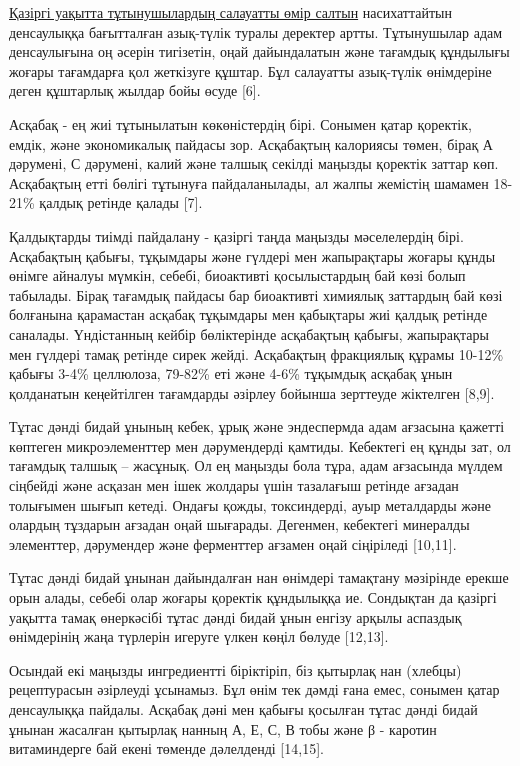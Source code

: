 \begin{multicols}{2}
\href{https://www.sciencedirect.com/topics/biochemistry-genetics-and-molecular-biology/healthy-lifestyle}{Қазіргі
уақытта тұтынушылардың салауатты өмір салтын} насихаттайтын денсаулыққа
бағытталған азық-түлік туралы деректер артты. Тұтынушылар адам
денсаулығына оң әсерін тигізетін, оңай дайындалатын және тағамдық
құндылығы жоғары тағамдарға қол жеткізуге құштар. Бұл салауатты
азық-түлік өнімдеріне деген құштарлық жылдар бойы өсуде {[}6{]}.

Асқабақ - ең жиі тұтынылатын көкөністердің бірі. Сонымен қатар қоректік,
емдік, және экономикалық пайдасы зор. Асқабақтың калориясы төмен, бірақ
А дәрумені, С дәрумені, калий және талшық секілді маңызды қоректік
заттар көп. Асқабақтың етті бөлігі тұтынуға пайдаланылады, ал жалпы
жемістің шамамен 18-21\% қалдық ретінде қалады {[}7{]}.

Қалдықтарды тиімді пайдалану - қазіргі таңда маңызды мәселелердің бірі.
Асқабақтың қабығы, тұқымдары және гүлдері мен жапырақтары жоғары құнды
өнімге айналуы мүмкін, себебі, биоактивті қосылыстардың бай көзі болып
табылады. Бірақ тағамдық пайдасы бар биоактивті химиялық заттардың бай
көзі болғанына қарамастан асқабақ тұқымдары мен қабықтары жиі қалдық
ретінде саналады. Үндістанның кейбір бөліктерінде асқабақтың қабығы,
жапырақтары мен гүлдері тамақ ретінде сирек жейді. Асқабақтың фракциялық
құрамы 10-12\% қабығы 3-4\% целлюлоза, 79-82\% еті және 4-6\% тұқымдық
асқабақ ұнын қолданатын кеңейтілген тағамдарды әзірлеу бойынша зерттеуде
жіктелген {[}8,9{]}.

Тұтас дәнді бидай ұнының кебек, ұрық және эндеспермда адам ағзасына
қажетті көптеген микроэлементтер мен дәрумендерді қамтиды. Кебектегі ең
құнды зат, ол тағамдық талшық -- жасұнық. Ол ең маңызды бола тұра, адам
ағзасында мүлдем сіңбейді және асқазан мен ішек жолдары үшін тазалағыш
ретінде ағзадан толығымен шығып кетеді. Ондағы қожды, токсиндерді, ауыр
металдарды және олардың тұздарын ағзадан оңай шығарады. Дегенмен,
кебектегі минералды элементтер, дәрумендер және ферменттер ағзамен оңай
сіңіріледі {[}10,11{]}.

Тұтас дәнді бидай ұнынан дайындалған нан өнімдері тамақтану мәзірінде
ерекше орын алады, себебі олар жоғары қоректік құндылыққа ие. Сондықтан
да қазіргі уақытта тамақ өнеркәсібі тұтас дәнді бидай ұнын енгізу арқылы
аспаздық өнімдерінің жаңа түрлерін игеруге үлкен көңіл бөлуде
{[}12,13{]}.

Осындай екі маңызды ингредиентті біріктіріп, біз қытырлақ нан (хлебцы)
рецептурасын әзірлеуді ұсынамыз. Бұл өнім тек дәмді ғана емес, сонымен
қатар денсаулыққа пайдалы. Асқабақ дәні мен қабығы қосылған тұтас дәнді
бидай ұнынан жасалған қытырлақ нанның А, Е, С, В тобы және β - каротин
витаминдерге бай екені төменде дәлелденді {[}14,15{]}.


\end{multicols}
